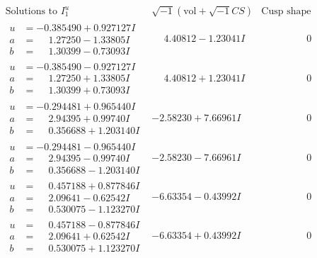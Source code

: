 \documentclass[1p]{elsarticle_modified}
\theoremstyle{definition}
\newcommand{\I}{\sqrt{-1}}
\begin{document}
$$\begin{array}{c|c|c}  
\text{Solutions to }I^u_{1}& \I (\text{vol} + \sqrt{-1}CS) & \text{Cusp shape}\\
 \hline 
\begin{aligned}
u &= -0.385490 + 0.927127 I \\
a &= \phantom{-}1.27250 - 1.33805 I \\
b &= \phantom{-}1.30399 - 0.73093 I\end{aligned}
 & \phantom{-}4.40812 - 1.23041 I & \phantom{-0.000000 } 0 \\ \hline\begin{aligned}
u &= -0.385490 - 0.927127 I \\
a &= \phantom{-}1.27250 + 1.33805 I \\
b &= \phantom{-}1.30399 + 0.73093 I\end{aligned}
 & \phantom{-}4.40812 + 1.23041 I & \phantom{-0.000000 } 0 \\ \hline\begin{aligned}
u &= -0.294481 + 0.965440 I \\
a &= \phantom{-}2.94395 + 0.99740 I \\
b &= \phantom{-}0.356688 + 1.203140 I\end{aligned}
 & -2.58230 + 7.66961 I & \phantom{-0.000000 } 0 \\ \hline\begin{aligned}
u &= -0.294481 - 0.965440 I \\
a &= \phantom{-}2.94395 - 0.99740 I \\
b &= \phantom{-}0.356688 - 1.203140 I\end{aligned}
 & -2.58230 - 7.66961 I & \phantom{-0.000000 } 0 \\ \hline\begin{aligned}
u &= \phantom{-}0.457188 + 0.877846 I \\
a &= \phantom{-}2.09641 - 0.62542 I \\
b &= \phantom{-}0.530075 - 1.123270 I\end{aligned}
 & -6.63354 - 0.43992 I & \phantom{-0.000000 } 0 \\ \hline\begin{aligned}
u &= \phantom{-}0.457188 - 0.877846 I \\
a &= \phantom{-}2.09641 + 0.62542 I \\
b &= \phantom{-}0.530075 + 1.123270 I\end{aligned}
 & -6.63354 + 0.43992 I & \phantom{-0.000000 } 0 \\ \hline\begin{aligned}

\end{aligned}
\end{array}$$
\end{document}
